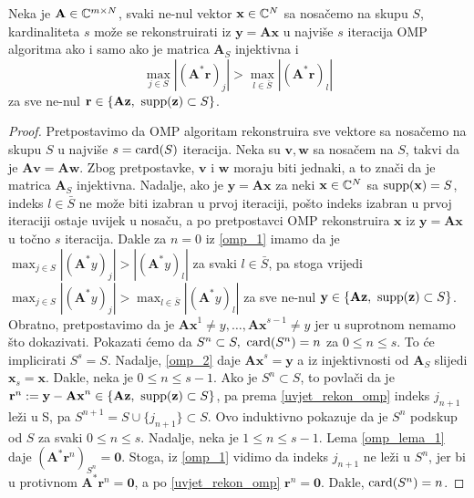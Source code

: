 \documentclass[a4paper,twoside,12pt]{memoir} %
\newcommand{\vect}[1]{\mathbf{#1}}
\renewcommand{\vec}{\vect}
\newcommand{\card}{\text{\normalfont{card}}}
\newcommand{\supp}{\text{\normalfont{supp}}}
\begin{document}
\begin{prop}\label{prop:3:5}
    Neka je $\vec A \in \C^{m \times N}$, svaki ne-nul vektor $\vec x \in \C^N$ sa nosa\v{c}emo na skupu $S$, kardinaliteta $s$ mo\v{z}e se rekonstruirati iz $\vec y = \vec{Ax}$ u najvi\v{s}e $s$ iteracija OMP algoritma ako i samo ako je matrica $\vec A_S$ injektivna i 
    \begin{equation}\label{uvjet_rekon_omp}
        \max_{j \in S}|(\vec A^* \vec r)_j| > \max_{l \in \bar{S}}|(\vec A^* \vec r)_l|
    \end{equation}
    za sve ne-nul $\vec r \in \{\vec{Az},\ \supp(\vec z) \subset S\}$.
\end{prop}
\begin{proof}
    Pretpostavimo da OMP algoritam rekonstruira sve vektore sa nosa\v{c}emo na skupu $S$ u najvi\v{s}e $s = \card(S)$ iteracija. Neka su $\vec v, \vec w$ sa nosa\v{c}em na $S$, takvi da je $\vec{Av}=\vec{Aw}$. Zbog pretpostavke, $\vec v$ i $\vec w$ moraju biti jednaki, a to zna\v{c}i da je matrica $\vec A_S$ injektivna. Nadalje, ako je $\vec y = \vec{Ax}$ za neki $\vec x \in \C^N$ sa $\supp(\vec x)=S$, indeks $l \in \bar S$ ne mo\v{z}e biti izabran u prvoj iteraciji, po\v{s}to indeks izabran u prvoj iteraciji ostaje uvijek u nosa\v{c}u, a po pretpostavci OMP rekonstruira $\vec x$ iz $\vec y = \vec{Ax}$ u to\v{c}no $s$ iteracija. Dakle za $n=0$ iz \eqref{omp_1} imamo da je $\max_{j \in S}|(\vec A^*y)_j| > |(\vec A^*y)_l|$ za svaki $l \in \bar{S}$, pa stoga vrijedi $\max_{j \in S}|(\vec A^*y)_j| > \max_{l \in \bar{S}}|(\vec A^*y)_l|$ za sve ne-nul $\vec y \in \{\vec{Az},\ \supp(\vec z) \subset S\}$. \\
    \indent
    Obratno, pretpostavimo da je $\vec{Ax}^1 \neq y,\dots,\vec{Ax}^{s-1} \neq y$ jer u suprotnom nemamo \v{s}to dokazivati. Pokazati \'cemo da $S^n \subset S,\ \card(S^n)=n$ za $0 \leq n \leq s$. To \'ce implicirati $S^s = S$. Nadalje, \eqref{omp_2} daje $\vec{Ax}^s = \vec y$ a iz injektivnosti od $\vec{A}_S$ slijedi $\vec x_s = \vec{x}$. Dakle, neka je $0 \leq n \leq s-1$. Ako je $S^n \subset S$, to povla\v{c}i da je $\vec r^n := \vec y - \vec{Ax}^n \in \{\vec{Az},\ \supp(\vec z) \subset S\}$, pa prema \eqref{uvjet_rekon_omp} indeks $j_{n+1}$ le\v{z}i u S, pa $S^{n+1} = S \cup \{j_{n+1}\} \subset S$. Ovo induktivno pokazuje da je $S^n$ podskup od $S$ za svaki $0 \leq n \leq s$. Nadalje, neka je $1 \leq n \leq s-1$. Lema \eqref{omp_lema_1} daje $(\vec{A}^* \vec r^n)_{S^n} = \vec 0$. Stoga, iz \eqref{omp_1} vidimo da indeks $j_{n+1}$ ne le\v{z}i u $S^{n}$, jer bi u protivnom $\vec A^* \vec r^n = \vec 0$, a po \eqref{uvjet_rekon_omp} $\vec r^n = \vec 0$. Dakle, $\card(S^n)=n$.
\end{proof}
\end{document}
